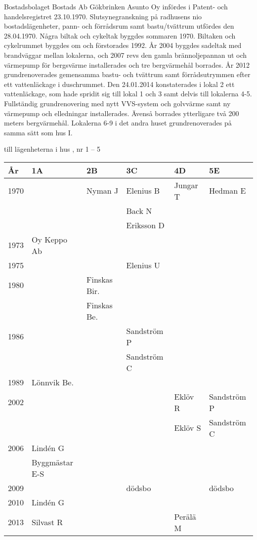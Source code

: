 Bostadsbolaget Bostads Ab Gökbrinken Asunto Oy infördes i Patent- och handelsregistret 23.10.1970. Slutsynegranskning på radhusens nio bostadslägenheter, pann- och förrådsrum samt bastu/tvättrum utfördes den 28.04.1970. Några biltak och cykeltak byggdes sommaren 1970. Biltaken och cykelrummet byggdes om och förstorades 1992. År 2004 byggdes sadeltak med brandväggar mellan lokalerna, och 2007 revs den gamla brännoljepannan ut och värmepump för bergsvärme installerades och tre bergvärmehål borrades. År 2012 grundrenoverades gemensamma bastu- och tvättrum samt förrådsutrymmen efter ett vattenläckage i duschrummet.
Den 24.01.2014 konstaterades i lokal 2 ett vattenläckage, som hade spridit sig till lokal 1 och 3 samt delvis till lokalerna 4-5. Fullständig grundrenovering med nytt VVS-system och golvvärme samt ny värmepump och elledningar installerades. Ävenså borrades ytterligare två 200 meters bergvärmehål. Lokalerna 6-9 i det andra huset grundrenoverades på samma sätt som hus I.

 till lägenheterna i hus , nr 1 – 5
\begin{center}
  \begin{tabular}{l l l l l l}
    År & 1A & 2B & 3C & 4D & 5E \\ \hline
    1970 &  & Nyman J & Elenius B & Jungar T & Hedman E \\
      &  &  & Back N &  &  \\
      &  &  & Eriksson D &  &  \\
    1973 & Oy Keppo Ab &   &   &   &   \\
    1975 &   &   & Elenius U &   &   \\
    1980 &   & Finskas Bir. &   &   &   \\
      &   & Finskas Be. &   &   &   \\
    1986 &   &   & Sandström P &   &   \\
      &   &   & Sandström C &   &   \\
    1989 & Lönnvik Be. &   &   &   &   \\
    2002 &   &   &   & Eklöv R & Sandström P \\
      &   &   &   & Eklöv S & Sandström C \\
    2006 & Lindén G &   &   &   &   \\
      & Byggmästar E-S &   &   &   &   \\
    2009 &   &   & dödsbo &   & dödsbo \\
    2010 & Lindén G &   &   &   &   \\
    2013 & Silvast R &   &   & Perälä M &   \\
  \end{tabular}
\end{center}



